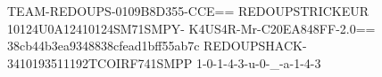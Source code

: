 TEAM-REDOUPS-0109B8D355-CCE==
REDOUPSTRICKEUR 10124U0A12410124SM71SMPY-
K4US4R-Mr-C20EA848FF-2.0==
38cb44b3ea9348838cfead1bff55ab7c
REDOUPSHACK-3410193511192TCOIRF741SMPP
1-0-1-4-3-u-0-_-a-1-4-3

